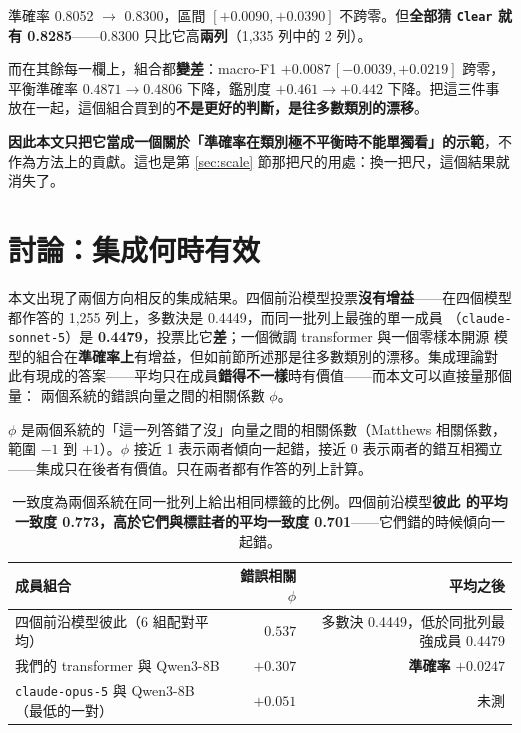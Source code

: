 \documentclass[11pt,a4paper]{ctexart}
\newcommand{\fn}[1]{\texttt{#1}}
\begin{document}
\begin{tcolorbox}[colback=red!6, colframe=red!45, title=本文不把這個結果列為正面結果]
準確率 0.8052 $\to$ 0.8300，區間 $[+0.0090, +0.0390]$ 不跨零。但\textbf{全部猜
\fn{Clear} 就有 0.8285}——0.8300 只比它高\textbf{兩列}（1{,}335 列中的 2 列）。

\medskip
而在其餘每一欄上，組合都\textbf{變差}：macro-F1 $+0.0087\,[-0.0039, +0.0219]$ 跨零，
平衡準確率 $0.4871 \to 0.4806$ 下降，鑑別度 $+0.461 \to +0.442$ 下降。把這三件事
放在一起，這個組合買到的\textbf{不是更好的判斷，是往多數類別的漂移}。

\medskip
\textbf{因此本文只把它當成一個關於「準確率在類別極不平衡時不能單獨看」的示範}，不
作為方法上的貢獻。這也是第 \ref{sec:scale} 節那把尺的用處：換一把尺，這個結果就
消失了。
\end{tcolorbox}

\section{討論：集成何時有效}
\label{sec:voting}

本文出現了兩個方向相反的集成結果。四個前沿模型投票\textbf{沒有增益}——在四個模型
都作答的 1{,}255 列上，多數決是 0.4449，而同一批列上最強的單一成員
（\fn{claude-sonnet-5}）是 \textbf{0.4479}，投票比它\textbf{差}；一個微調 transformer 與一個零樣本開源
模型的組合在\textbf{準確率上}有增益，但如前節所述那是往多數類別的漂移。集成理論對
此有現成的答案——平均只在成員\textbf{錯得不一樣}時有價值——而本文可以直接量那個量：
兩個系統的錯誤向量之間的相關係數 $\phi$。


\medskip
$\phi$ 是兩個系統的「這一列答錯了沒」向量之間的相關係數（Matthews 相關係數，
範圍 $-1$ 到 $+1$）。$\phi$ 接近 1 表示兩者傾向一起錯，接近 0 表示兩者的錯互相獨立
——集成只在後者有價值。只在兩者都有作答的列上計算。

\begin{table}[h]
\centering\small
\begin{tabular}{@{}lrr@{}}
\toprule
成員組合 & 錯誤相關 $\phi$ & 平均之後 \\
\midrule
\rowcolor{red!8}
四個前沿模型彼此（6 組配對平均） & $0.537$ & 多數決 0.4449，低於同批列最強成員 0.4479 \\
\rowcolor{green!12}
我們的 transformer 與 Qwen3-8B & $\mathbf{+0.307}$ & \textbf{準確率} $\mathbf{+0.0247}$ \\
\fn{claude-opus-5} 與 Qwen3-8B（最低的一對） & $+0.051$ & 未測 \\
\bottomrule
\end{tabular}
\caption{一致度為兩個系統在同一批列上給出相同標籤的比例。四個前沿模型\textbf{彼此
的平均一致度 0.773，高於它們與標註者的平均一致度 0.701}——它們錯的時候傾向一起錯。}
\end{table}
\end{document}
